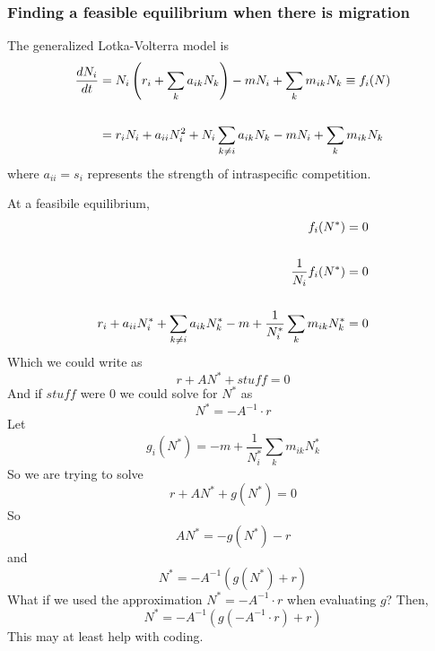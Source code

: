 \documentclass{article}
\begin{document}
\subsubsection*{Finding a feasible equilibrium when there is migration}
The generalized Lotka-Volterra model is
\begin{align}
\dfrac{dN_i}{dt} 
&= N_i\left(r_i+\sum_k a_{ik}N_k\right)-mN_i+\sum_k m_{ik}N_k \equiv f_i(N) \\
\notag\\
&=r_iN_i + a_{ii}N_i^2 + N_i\sum_{k\neq i} a_{ik}N_k - mN_i + \sum_k m_{ik} N_k
\end{align}
where $a_{ii} = s_i$ represents the strength of intraspecific competition.

At a feasibile equilibrium,
\begin{align}
f_i(N^*) &= 0 \notag \\
\notag \\
\dfrac{1}{N_i}f_i(N^*) &= 0 \notag \\
\notag \\
r_i + a_{ii}N_i^* + \sum_{k\neq i} a_{ik}N_k^* - m + \dfrac{1}{N_i^*}\sum_k m_{ik} N_k^* &= 0 
\end{align}
Which we could write as
\begin{equation}
r + AN^* + stuff = 0
\end{equation}
And if $stuff$ were 0 we could solve for $N^*$ as
\begin{equation}
N^* = -A^{-1} \cdot r
\end{equation}
Let
\begin{equation} 
g_i(N^*) = - m + \dfrac{1}{N_i^*}\sum_k m_{ik} N_k^*
\end{equation}
So we are trying to solve
\begin{equation} 
r + AN^* + g(N^*) = 0 
\end{equation}
So
\begin{equation} 
AN^* = -g(N^*) -r
\end{equation}
and
\begin{equation} 
N^* = -A^{-1}\left(g(N^*) +r\right)
\end{equation}
What if we used the approximation $N^* = -A^{-1} \cdot r$ when evaluating $g$?
Then,
\begin{equation} 
    N^* = -A^{-1}\left(g(-A^{-1} \cdot r) +r\right)
\end{equation}
This may at least help with coding.
\end{document}
